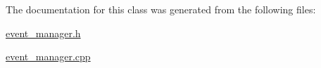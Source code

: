 The documentation for this class was generated from the following files\-:\begin{DoxyCompactItemize}
\item 
\hyperlink{event__manager_8h}{event\-\_\-manager.\-h}\item 
\hyperlink{event__manager_8cpp}{event\-\_\-manager.\-cpp}\end{DoxyCompactItemize}
